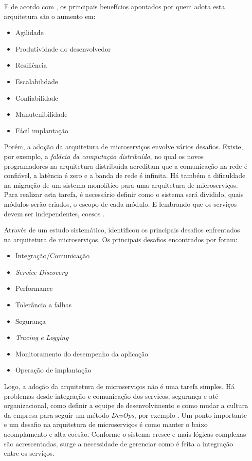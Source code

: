 \documentclass[12pt]{article}
\theoremstyle{plain}
\begin{document}
E de acordo com \cite{Alshuqayran:2016}, os principais benefícios apontados por quem adota esta arquitetura são o aumento em:
\begin{itemize}
    \item Agilidade
    \item Produtividade do desenvolvedor
    \item Resiliência
    \item Escalabilidade
    \item Confiabilidade
    \item Manutenibilidade
    \item Fácil implantação
\end{itemize}

Porém, a adoção da arquitetura de microserviços envolve vários desafios. Existe, por exemplo, a \textit{falácia da computação distribuída}, no qual os novos programadores na arquitetura distribuída acreditam que a comunicação na rede é confiável, a latência é zero e a banda de rede é infinita. Há também a dificuldade na migração de um sistema monolítico para uma arquitetura de microserviços. Para realizar esta tarefa, é necessário definir como o sistema será dividido, quais módulos serão criados, o escopo de cada módulo. E lembrando que os serviços devem ser independentes, coesos \cite{jung:2017}. 

Através de um estudo sistemático, \cite{Alshuqayran:2016} identificou os principais desafios enfrentados na arquitetura de microserviços. Os principais desafios encontrados por \cite{Alshuqayran:2016} foram:
\begin{itemize}
    \item Integração/Comunicação
    \item \textit{Service Discovery}
    \item Performance
    \item Tolerância a falhas
    \item Segurança
    \item \textit{Tracing e Logging}
    \item Monitoramento do desempenho da aplicação
    \item Operação de implantação
\end{itemize}

Logo, a adoção da arquitetura de microserviços não é uma tarefa simples. Há problemas desde integração e comunicação dos servicos, segurança e até organizacional, como definir a equipe de desenvolvimento e como mudar a cultura da empresa para seguir um método \textit{DevOps}, por exemplo \cite{jung:2017}. Um ponto importante e um desafio na arquitetura de microserviços é como manter o baixo acomplamento e alta coesão. Conforme o sistema cresce e mais lógicas complexas são acrescentadas, surge a necessidade de gerenciar como é feita a integração entre os serviços. 
\end{document}
